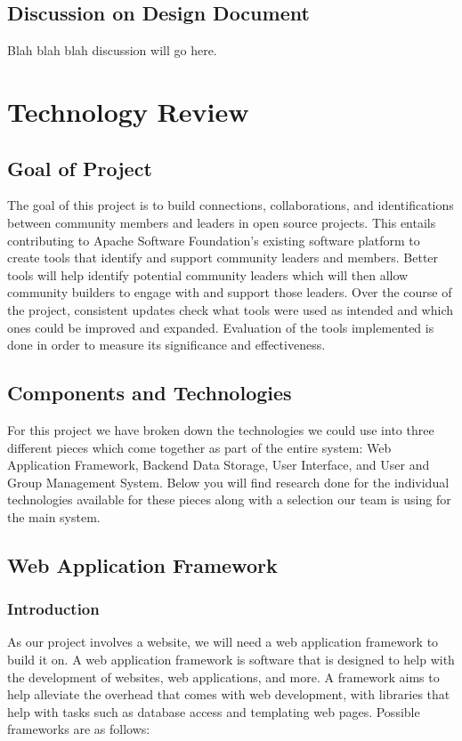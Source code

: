 \documentclass[draftclsnofoot,10pt,onecolumn]{IEEEtran} %
\begin{document}
\subsection{Discussion on Design Document}
Blah blah blah discussion will go here.

\section{Technology Review}

\subsection{Goal of Project} 
The goal of this project is to build connections, collaborations, and identifications between community members and leaders
in open source projects. This entails contributing to Apache Software Foundation’s existing software platform to create tools
that identify and support community leaders and members. Better tools will help identify potential community leaders which
will then allow community builders to engage with and support those leaders. Over the course of the project, consistent
updates check what tools were used as intended and which ones could be improved and expanded. Evaluation of the tools
implemented is done in order to measure its significance and effectiveness. \\

\subsection{Components and Technologies}
For this project we have broken down the technologies we could use into three different pieces which come together as part
of the entire system: Web Application Framework, Backend Data Storage, User Interface, and User and Group Management
System. Below you will find research done for the individual technologies available for these pieces along with a selection
our team is using for the main system. \\

\subsection{Web Application Framework}

\subsubsection{Introduction}
As our project involves a website, we will need a web application framework to build it on. A web application framework is
software that is designed to help with the development of websites, web applications, and more. A framework aims to help
alleviate the overhead that comes with web development, with libraries that help with tasks such as database access and
templating web pages. Possible frameworks are as follows:
\end{document}
